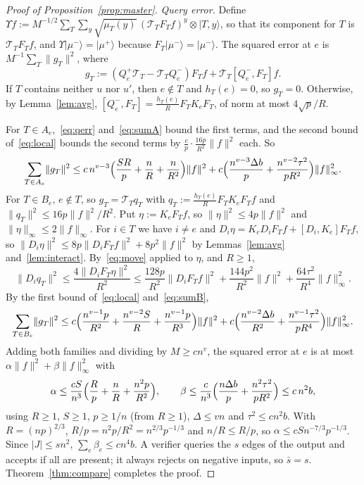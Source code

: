 \documentclass[11pt]{article}
\theoremstyle{remark}
\newcommand{\abs}[1]{\lvert #1\rvert}
\newcommand{\norm}[1]{\lVert #1\rVert}
\newcommand{\ket}[1]{\lvert #1\rangle}
\begin{document}
\begin{proof}[Proof of Proposition~\ref{prop:master}]
\emph{Query error.} Define $\Upsilon f:=M^{-1/2}\sum_T\sum_y\sqrt{\mu_T(y)}\,(\mathcal T_TF_Tf)^{y}\otimes\ket{T,y}$, so that its component for $T$ is $\mathcal T_TF_Tf$, and $\Upsilon\ket{\mu^-}=\ket{\mu^+}$ because $F_T\ket{\mu^-}=\ket{\mu^-}$. The squared error at $e$ is $M^{-1}\sum_T\norm{g_T}^2$, where
\[g_T:=(Q_e^+\mathcal T_T-\mathcal T_TQ_e^-)F_Tf+\mathcal T_T[Q_e^-,F_T]f.\]
If $T$ contains neither $u$ nor $u'$, then $e\notin T$ and $h_T(e)=0$, so $g_T=0$. Otherwise, by Lemma~\ref{lem:avg}, $[Q_e^-,F_T]=\frac{h_T(e)}RF_TK_eF_T$, of norm at most $4\sqrt p/R$.

For $T\in A_e$,~\eqref{eq:qerr} and~\eqref{eq:sumA} bound the first terms, and the second bound of~\eqref{eq:local} bounds the second terms by $\frac cp\cdot\frac{16p}{R^2}\norm f^2$ each. So
\[\sum_{T\in A_e}\norm{g_T}^2\le c\,n^{v-3}\Bigl(\frac{SR}p+\frac nR+\frac n{R^2}\Bigr)\norm f^2+c\Bigl(\frac{n^{v-3}\Delta b}p+\frac{n^{v-2}\tau^2}{pR^2}\Bigr)\norm f_\infty^2.\]
For $T\in B_e$, $e\notin T$, so $g_T=\mathcal T_Tq_T$ with $q_T:=\frac{h_T(e)}RF_TK_eF_Tf$ and $\norm{q_T}^2\le16p\norm f^2/R^2$. Put $\eta:=K_eF_Tf$, so $\norm\eta^2\le4p\norm f^2$ and $\norm\eta_\infty\le2\norm f_\infty$. For $i\in T$ we have $i\ne e$ and $D_i\eta=K_eD_iF_Tf+[D_i,K_e]F_Tf$, so $\norm{D_i\eta}^2\le8p\norm{D_iF_Tf}^2+8p^2\norm f^2$ by Lemmas~\ref{lem:avg} and~\ref{lem:interact}. By~\eqref{eq:move} applied to $\eta$, and $R\ge1$,
\[\norm{D_iq_T}^2\le\frac{4\norm{D_iF_T\eta}^2}{R^2}\le\frac{128p}{R^2}\norm{D_iF_Tf}^2+\frac{144p^2}{R^2}\norm f^2+\frac{64\tau^2}{R^4}\norm f_\infty^2.\]
By the first bound of~\eqref{eq:local} and~\eqref{eq:sumB},
\[\sum_{T\in B_e}\norm{g_T}^2\le c\Bigl(\frac{n^{v-1}p}{R^2}+\frac{n^{v-2}S}R+\frac{n^{v-1}p}{R^3}\Bigr)\norm f^2+c\Bigl(\frac{n^{v-2}\Delta b}{R^2}+\frac{n^{v-1}\tau^2}{pR^4}\Bigr)\norm f_\infty^2.\]
Adding both families and dividing by $M\ge cn^v$, the squared error at $e$ is at most $\alpha\norm f^2+\beta\norm f_\infty^2$ with
\[\alpha\le\frac{cS}{n^3}\Bigl(\frac Rp+\frac nR+\frac{n^2p}{R^2}\Bigr),\qquad\beta\le\frac c{n^3}\Bigl(\frac{n\Delta b}p+\frac{n^2\tau^2}{pR^2}\Bigr)\le c\,n^{2}b,\]
using $R\ge1$, $S\ge1$, $p\ge1/n$ (from $R\ge1$), $\Delta\le vn$ and $\tau^2\le cn^2b$. With $R=(np)^{2/3}$, $R/p=n^2p/R^2=n^{2/3}p^{-1/3}$ and $n/R\le R/p$, so $\alpha\le cSn^{-7/3}p^{-1/3}$. Since $\abs J\le sn^2$, $\sum_e\beta_e\le cn^4b$. A verifier queries the $s$ edges of the output and accepts if all are present; it always rejects on negative inputs, so $\bar s=s$. Theorem~\ref{thm:compare} completes the proof.
\end{proof}
\end{document}
